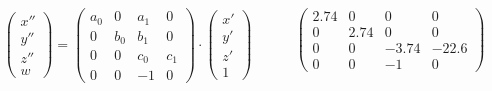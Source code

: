 \documentclass[pdf]{beamer}
\begin{document}
\begin{frame}[t]
\begin{columns}
\begin{column}{0.5\textwidth}
\begin{enumerate}
	\end{enumerate}
\end{column}
\end{columns}
\begin{columns}
	\begin{column}{0.56\textwidth}
	\begin{block}{}
	$$\begin{pmatrix}
		x''\\
		y''\\
		z'' \\
		w
	\end{pmatrix}=
	\begin{pmatrix}
		a_0 & 0&a_1&0\\
		0&b_0&b_1&0\\
		0&0&c_0&c_1\\
		0&0&-1&0
	\end{pmatrix}\cdot 
	\begin{pmatrix}
		x'\\
		y'\\
		z'\\
		1
	\end{pmatrix}
	$$
\end{block}
\end{column}
\begin{column}{0.5\textwidth}
	\begin{block}{}
	$$\begin{pmatrix}
		2.74 & 0&0&0\\
		0&2.74 &0&0\\
		0&0&-3.74&-22.6\\
		0&0&-1&0
	\end{pmatrix}$$
	\end{block}
\end{column}

\end{columns}
\end{frame}
\end{document}

